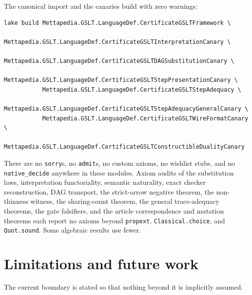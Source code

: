 \documentclass[]{article}
\theoremstyle{remark}
\newcommand{\code}[1]{\texttt{#1}}
\begin{document}
The canonical import and the canaries build with zero warnings:

\begin{lstlisting}
lake build Mettapedia.GSLT.LanguageDef.CertificateGSLTFramework \
           Mettapedia.GSLT.LanguageDef.CertificateGSLTInterpretationCanary \
           Mettapedia.GSLT.LanguageDef.CertificateGSLTDAGSubstitutionCanary \
           Mettapedia.GSLT.LanguageDef.CertificateGSLTStepPresentationCanary \
           Mettapedia.GSLT.LanguageDef.CertificateGSLTStepAdequacy \
           Mettapedia.GSLT.LanguageDef.CertificateGSLTStepAdequacyGeneralCanary \
           Mettapedia.GSLT.LanguageDef.CertificateGSLTWireFormatCanary \
           Mettapedia.GSLT.LanguageDef.CertificateGSLTConstructibleDualityCanary
\end{lstlisting}

There are no \code{sorry}s, no \code{admit}s, no custom axioms, no wishlist
stubs, and no \code{native\_decide} anywhere in these modules.  Axiom audits
of the substitution laws, interpretation functoriality, semantic naturality,
exact checker reconstruction, DAG transport, the strict-arrow negative
theorem, the non-thinness witness, the sharing-count theorem, the general
trace-adequacy theorems, the gate falsifiers, and the article
correspondence and mutation theorems each report no axioms beyond
\code{propext}, \code{Classical.choice}, and \code{Quot.sound}.  Some
algebraic results use fewer.

\section{Limitations and future work}
\label{sec:future}

The current boundary is stated so that nothing beyond it is implicitly
assumed.
\end{document}
